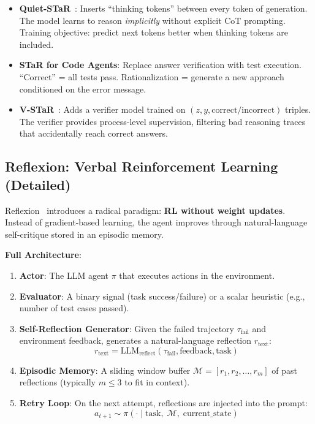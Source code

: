 \begin{intuitionbox}
\begin{itemize}
  \item \textbf{Quiet-STaR}~\cite{zelikman2024quietstar}: Inserts ``thinking tokens'' between every token of generation. The model learns to reason \emph{implicitly} without explicit CoT prompting. Training objective: predict next tokens better when thinking tokens are included.
  \item \textbf{STaR for Code Agents}: Replace answer verification with test execution. ``Correct'' = all tests pass. Rationalization = generate a new approach conditioned on the error message.
  \item \textbf{V-STaR}~\cite{hosseini2024vstar}: Adds a verifier model trained on $(z, y, \text{correct/incorrect})$ triples. The verifier provides process-level supervision, filtering bad reasoning traces that accidentally reach correct answers.
\end{itemize}
\end{intuitionbox}

\subsection{Reflexion: Verbal Reinforcement Learning (Detailed)}
\label{reflexion-verbal-reinforcement-learning-detailed}

Reflexion~\cite{shinn2023reflexion} introduces a radical paradigm: \textbf{RL without weight updates}. Instead of gradient-based learning, the agent improves through natural-language self-critique stored in an episodic memory.

\textbf{Full Architecture}:

\begin{enumerate}
  \item \textbf{Actor}: The LLM agent $\pi$ that executes actions in the environment.
  \item \textbf{Evaluator}: A binary signal (task success/failure) or a scalar heuristic (e.g., number of test cases passed).
  \item \textbf{Self-Reflection Generator}: Given the failed trajectory $\tau_{\text{fail}}$ and environment feedback, generates a natural-language reflection $r_{\text{text}}$: 
\begin{equation}
r_{\text{text}} = \text{LLM}_{\text{reflect}}\!\left(\tau_{\text{fail}}, \text{feedback}, \text{task}\right)
\end{equation}
  \item \textbf{Episodic Memory}: A sliding window buffer $\mathcal{M} = [r_1, r_2, \ldots, r_m]$ of past reflections (typically $m \leq 3$ to fit in context).
  \item \textbf{Retry Loop}: On the next attempt, reflections are injected into the prompt: 
\begin{equation}
a_{t+1} \sim \pi\!\left(\cdot\; |\; \text{task},\; \mathcal{M},\; \text{current\_state}\right)
\end{equation}
\end{enumerate}

